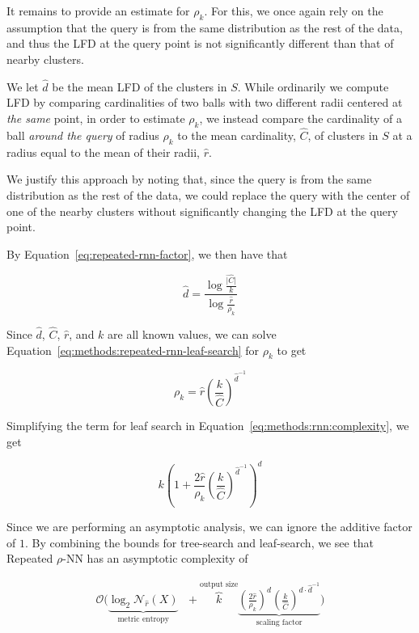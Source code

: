 It remains to provide an estimate for $\rho_k$. 
For this, we once again rely on the assumption that the query is from the same distribution as the rest of the data, and thus the LFD at the query point is not significantly different than that of nearby clusters.

We let $\hat{d}$ be the mean LFD of the clusters in $S$.
While ordinarily we compute LFD by comparing cardinalities of two balls with two different radii centered at \emph{the same} point, in order to estimate $\rho_k$, we instead compare the cardinality of a ball \emph{around the query} of radius $\rho_k$ to the mean cardinality, $\hat{C}$, of clusters in $S$ at a radius equal to the mean of their radii, $\hat{r}$.

We justify this approach by noting that, since the query is from the same distribution as the rest of the data, we could replace the query with the center of one of the nearby clusters without significantly changing the LFD at the query point.

By Equation~\ref{eq:repeated-rnn-factor}, we then have that

\begin{equation*}
    \hat{d} = \frac{\log{}\frac{\hat{|C|}}{k}}{\log{}\frac{\hat{r}}{\rho_k}}
\end{equation*}

Since $\hat{d}$, $\hat{C}$, $\hat{r}$, and $k$ are all known values, we can solve Equation~\ref{eq:methods:repeated-rnn-leaf-search} for $\rho_k$ to get

\begin{equation*}
    \rho_k = \hat{r} \left( \frac{k}{\hat{C}} \right)^{\hat{d}^{-1}}
\end{equation*}

Simplifying the term for leaf search in Equation~\ref{eq:methods:rnn:complexity}, we get

\begin{equation*}
    k \left( 1+ \frac{2\hat{r}}{\rho_k} \left( \frac{k}{\hat{C}} \right) ^ {\hat{d}^{-1}} \right)^d
\end{equation*}

Since we are performing an asymptotic analysis, we can ignore the additive factor of $1$.
By combining the bounds for tree-search and leaf-search, we see that Repeated $\rho$-NN has an asymptotic complexity of

\begin{gather}
    \mathcal{O}
    \Bigg(
        \underbrace{\log_2{\mathcal{N}_{\hat{r}}(X)}}_{\textrm{metric entropy}} \ \ \ + 
        \overbrace{k}^{\textrm{output size}}
        \underbrace{
            \left( \frac{2\hat{r}}{\rho_k} \right) ^ d \left( \frac{k}{\hat{C}} \right) ^ {d \cdot \hat{d}^{-1}}
        }_{\textrm{scaling factor}}
    \Bigg)
    \label{eq:methods:knn-by-rnn-complexity}
\end{gather}


